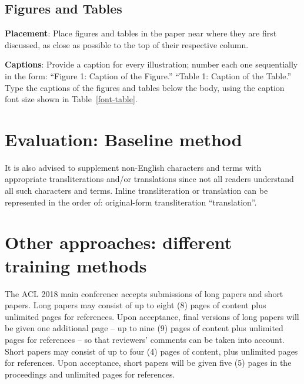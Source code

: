 \documentclass[11pt,a4paper]{article}
\begin{document}
\subsection{Figures and Tables}


\textbf{Placement}: Place figures and tables in the paper near where they are first discussed, as close as possible to the top of their respective column.


\textbf{Captions}: Provide a caption for every illustration; number each one
sequentially in the form:  ``Figure 1: Caption of the Figure.'' ``Table 1:
Caption of the Table.''  Type the captions of the figures and 
tables below the body, using the caption font size shown in Table~\ref{font-table}.

\section{Evaluation: Baseline method}

It is also advised to supplement non-English characters and terms
with appropriate transliterations and/or translations
since not all readers understand all such characters and terms.
Inline transliteration or translation can be represented in
the order of: original-form transliteration ``translation''.

\section{Other approaches: different training methods}
\label{sec:length}

The ACL 2018 main conference accepts submissions of long papers and
short papers.
 Long papers may consist of up to eight (8) pages of
content plus unlimited pages for references. Upon acceptance, final
versions of long papers will be given one additional page -- up to nine (9)
pages of content plus unlimited pages for references -- so that reviewers' comments
can be taken into account. Short papers may consist of up to four (4)
pages of content, plus unlimited pages for references. Upon
acceptance, short papers will be given five (5) pages in the
proceedings and unlimited pages for references. 
\end{document}
